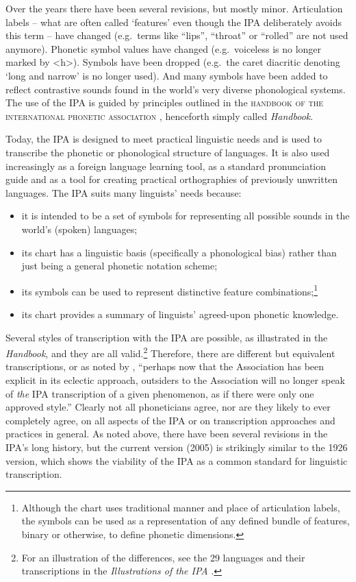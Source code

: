 Over the years there have been several revisions, but mostly minor. Articulation 
labels -- what are often called `features' even though the IPA
deliberately avoids this term -- have changed (e.g.\ terms like ``lips'', ``throat''
or ``rolled'' are not used anymore). Phonetic symbol values have changed (e.g.\
voiceless is no longer marked by <h>). Symbols have been dropped (e.g.\ the
caret diacritic denoting `long and narrow' is no longer used). And many symbols
have been added to reflect contrastive sounds found in the world's very diverse
phonological systems. The use of the IPA is guided by principles outlined in 
the \textsc{handbook of the international phonetic association} \citep{IPA1999}, 
henceforth simply called \textit{Handbook}. 

Today, the IPA is designed to meet practical linguistic needs and is used to
transcribe the phonetic or phonological structure of languages. It is also used
increasingly as a foreign language learning tool, as a standard pronunciation
guide and as a tool for creating practical orthographies of previously unwritten
languages. The IPA suits many linguists' needs because:

\begin{itemize}

	\item it is intended to be a set of symbols for representing all possible
       sounds in the world's (spoken) languages;
	\item its chart has a linguistic basis (specifically a phonological bias)
       rather than just being a general phonetic notation scheme;
	\item its symbols can be used to represent distinctive feature
       combinations;\footnote{Although the chart uses traditional manner and
       place of articulation labels, the symbols can be used as a representation
       of any defined bundle of features, binary or otherwise, to define
       phonetic dimensions.}
	\item its chart provides a summary of linguists' agreed-upon phonetic 
	knowledge.

\end{itemize}

Several styles of transcription with the IPA are possible, as illustrated in the
\textit{Handbook}, and they are all valid.\footnote{For an illustration of
the differences, see the 29 languages and their transcriptions in the
\textit{Illustrations of the IPA} \citep[41--154]{IPA1999}.} Therefore, there are 
different but equivalent transcriptions, or as noted by \citet[64]{Ladefoged1990a}, 
``perhaps now that the Association has been explicit in its eclectic approach, outsiders to the
Association will no longer speak of \textit{the} IPA transcription of a given
phenomenon, as if there were only one approved style.'' Clearly not all
phoneticians agree, nor are they likely to ever completely agree, on all aspects of the
IPA or on transcription approaches and practices in general. As noted above, 
there have been several revisions in the IPA's long history, but the current version (2005) is
strikingly similar to the 1926 version, which shows the viability of the IPA as a
common standard for linguistic transcription.

